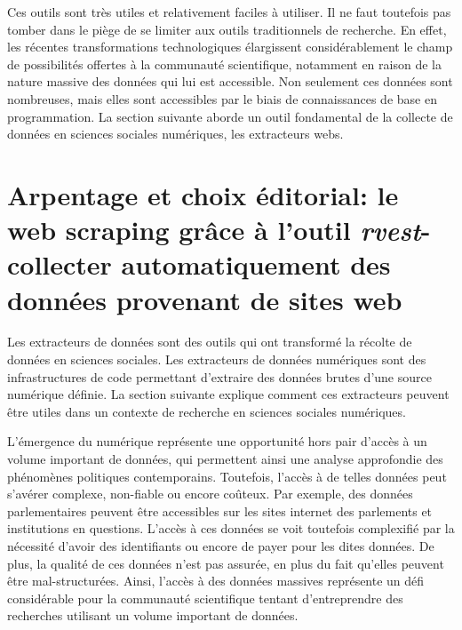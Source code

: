 \documentclass[
  letterpaper,
  DIV=11,
  numbers=noendperiod]{scrreprt}
\begin{document}
Ces outils sont très utiles et relativement faciles à utiliser. Il ne
faut toutefois pas tomber dans le piège de se limiter aux outils
traditionnels de recherche. En effet, les récentes transformations
technologiques élargissent considérablement le champ de possibilités
offertes à la communauté scientifique, notamment en raison de la nature
massive des données qui lui est accessible. Non seulement ces données
sont nombreuses, mais elles sont accessibles par le biais de
connaissances de base en programmation. La section suivante aborde un
outil fondamental de la collecte de données en sciences sociales
numériques, les extracteurs webs.

\section{\texorpdfstring{\textbf{Arpentage et choix éditorial: le web
scraping grâce à l'outil \emph{rvest}- collecter automatiquement des
données provenant de sites
web}}{Arpentage et choix éditorial: le web scraping grâce à l'outil rvest- collecter automatiquement des données provenant de sites web}}\label{arpentage-et-choix-uxe9ditorial-le-web-scraping-gruxe2ce-uxe0-loutil-rvest--collecter-automatiquement-des-donnuxe9es-provenant-de-sites-web}

Les extracteurs de données sont des outils qui ont transformé la récolte
de données en sciences sociales. Les extracteurs de données numériques
sont des infrastructures de code permettant d'extraire des données
brutes d'une source numérique définie. La section suivante explique
comment ces extracteurs peuvent être utiles dans un contexte de
recherche en sciences sociales numériques.

L'émergence du numérique représente une opportunité hors pair d'accès à
un volume important de données, qui permettent ainsi une analyse
approfondie des phénomènes politiques contemporains. Toutefois, l'accès
à de telles données peut s'avérer complexe, non-fiable ou encore
coûteux. Par exemple, des données parlementaires peuvent être
accessibles sur les sites internet des parlements et institutions en
questions. L'accès à ces données se voit toutefois complexifié par la
nécessité d'avoir des identifiants ou encore de payer pour les dites
données. De plus, la qualité de ces données n'est pas assurée, en plus
du fait qu'elles peuvent être mal-structurées. Ainsi, l'accès à des
données massives représente un défi considérable pour la communauté
scientifique tentant d'entreprendre des recherches utilisant un volume
important de données.
\end{document}
